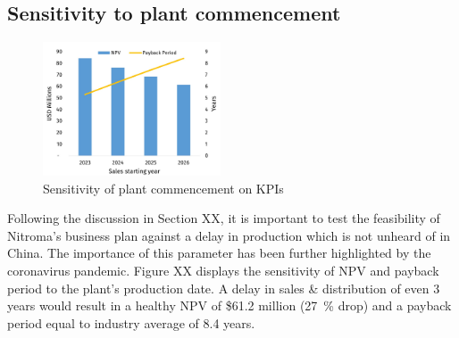 \subsection{Sensitivity to plant commencement}
\begin{figure}
    \vspace{-0.9cm}
    \caption{Sensitivity of plant commencement on KPIs}
    \label{Sensitivity_ProductionDelay}
    \includegraphics[width=0.47\textwidth]{chapters/6-economics/figures/Sensitivity_ProductionDelay.jpg}
\end{figure}
Following the discussion in Section XX, it is important to test the feasibility of Nitroma’s business plan against a delay in production which is not unheard of in China. The importance of this parameter has been further highlighted by the coronavirus pandemic. Figure XX displays the sensitivity of NPV and payback period to the plant’s production date. A delay in sales \& distribution of even 3 years would result in a healthy NPV of \$61.2 million (\SI{27}{\percent} drop) and a payback period equal to industry average of 8.4 years. 

